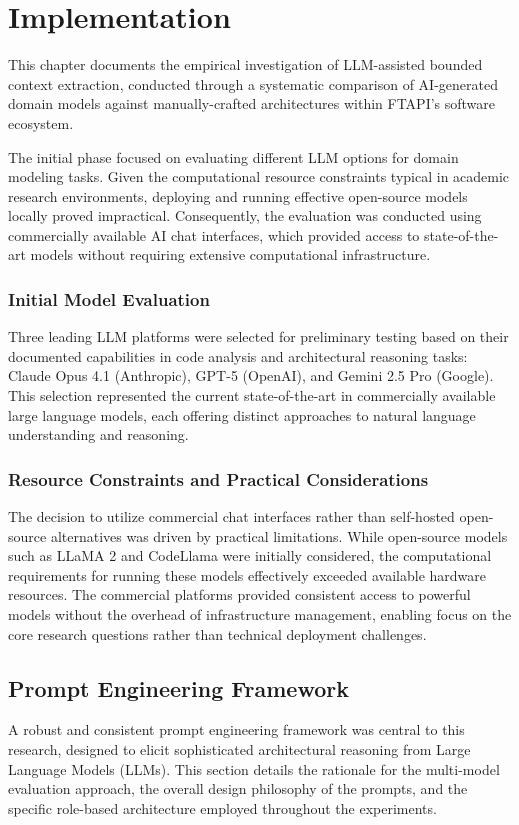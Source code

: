 \chapter{Implementation}\label{chapter:implementation}
This chapter documents the empirical investigation of LLM-assisted bounded context extraction, conducted through a systematic comparison of AI-generated domain models against manually-crafted architectures within FTAPI's software ecosystem.

The initial phase focused on evaluating different LLM options for domain modeling tasks. Given the computational resource constraints typical in academic research environments, deploying and running effective open-source models locally proved impractical. Consequently, the evaluation was conducted using commercially available AI chat interfaces, which provided access to state-of-the-art models without requiring extensive computational infrastructure.

\subsection{Initial Model Evaluation}
Three leading LLM platforms were selected for preliminary testing based on their documented capabilities in code analysis and architectural reasoning tasks: Claude Opus 4.1 (Anthropic), GPT-5 (OpenAI), and Gemini 2.5 Pro (Google). This selection represented the current state-of-the-art in commercially available large language models, each offering distinct approaches to natural language understanding and reasoning.

\subsection{Resource Constraints and Practical Considerations}
The decision to utilize commercial chat interfaces rather than self-hosted open-source alternatives was driven by practical limitations. While open-source models such as LLaMA 2 and CodeLlama were initially considered, the computational requirements for running these models effectively exceeded available hardware resources. The commercial platforms provided consistent access to powerful models without the overhead of infrastructure management, enabling focus on the core research questions rather than technical deployment challenges.

\section{Prompt Engineering Framework}
A robust and consistent prompt engineering framework was central to this research, designed to elicit sophisticated architectural reasoning from Large Language Models (LLMs). This section details the rationale for the multi-model evaluation approach, the overall design philosophy of the prompts, and the specific role-based architecture employed throughout the experiments.

